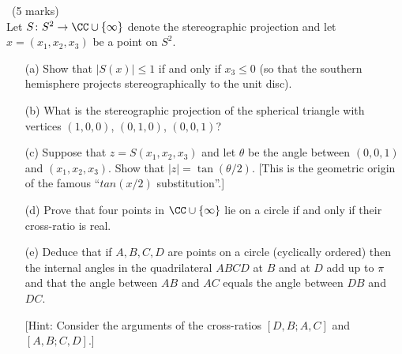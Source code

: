 \documentclass[12pt]{article}
\begin{document}
\begin{question}\ (5 marks)\\
  Let $S\colon S^2\to\CC\cup\{\infty\}$ denote the stereographic projection and let $x=(x_1,x_2,x_3)$ be a point on $S^2$.
  \begin{enumerate}
  \item[(a)] Show that $|S(x)|\leq 1$ if and only if $x_3\leq 0$ (so that the southern hemisphere projects stereographically to the unit disc).
  \item[(b)] What is the stereographic projection of the spherical triangle with vertices $(1,0,0)$, $(0,1,0)$, $(0,0,1)$?
  \item[(c)] Suppose that $z=S(x_1,x_2,x_3)$ and let $\theta$ be the angle between $(0,0,1)$ and $(x_1,x_2,x_3)$. Show that $|z|=\tan(\theta/2)$. [This is the geometric origin of the famous ``$tan(x/2)$ substitution''.]
  \item[(d)] Prove that four points in $\CC\cup\{\infty\}$ lie on a circle if and only if their cross-ratio is real.
  \item[(e)] Deduce that if $A,B,C,D$ are points on a circle (cyclically ordered) then the internal angles in the quadrilateral $ABCD$ at $B$ and at $D$ add up to $\pi$ and that the angle between $AB$ and $AC$ equals the angle between $DB$ and $DC$.
    
    [Hint: Consider the arguments of the cross-ratios $[D,B;A,C]$ and $[A,B;C,D]$.]
  \end{enumerate}
\end{question}
\end{document}
